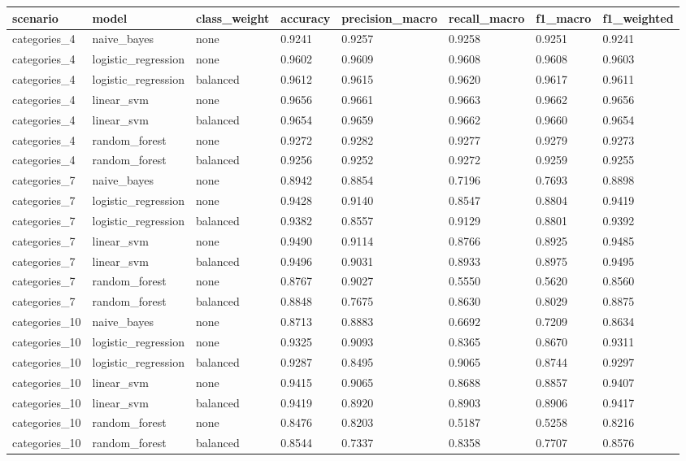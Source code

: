 \begin{tabular}{llllllll}
\hline
scenario & model & class\_weight & accuracy & precision\_macro & recall\_macro & f1\_macro & f1\_weighted \\
\hline
categories\_4 & naive\_bayes & none & 0.9241 & 0.9257 & 0.9258 & 0.9251 & 0.9241 \\
categories\_4 & logistic\_regression & none & 0.9602 & 0.9609 & 0.9608 & 0.9608 & 0.9603 \\
categories\_4 & logistic\_regression & balanced & 0.9612 & 0.9615 & 0.9620 & 0.9617 & 0.9611 \\
categories\_4 & linear\_svm & none & 0.9656 & 0.9661 & 0.9663 & 0.9662 & 0.9656 \\
categories\_4 & linear\_svm & balanced & 0.9654 & 0.9659 & 0.9662 & 0.9660 & 0.9654 \\
categories\_4 & random\_forest & none & 0.9272 & 0.9282 & 0.9277 & 0.9279 & 0.9273 \\
categories\_4 & random\_forest & balanced & 0.9256 & 0.9252 & 0.9272 & 0.9259 & 0.9255 \\
categories\_7 & naive\_bayes & none & 0.8942 & 0.8854 & 0.7196 & 0.7693 & 0.8898 \\
categories\_7 & logistic\_regression & none & 0.9428 & 0.9140 & 0.8547 & 0.8804 & 0.9419 \\
categories\_7 & logistic\_regression & balanced & 0.9382 & 0.8557 & 0.9129 & 0.8801 & 0.9392 \\
categories\_7 & linear\_svm & none & 0.9490 & 0.9114 & 0.8766 & 0.8925 & 0.9485 \\
categories\_7 & linear\_svm & balanced & 0.9496 & 0.9031 & 0.8933 & 0.8975 & 0.9495 \\
categories\_7 & random\_forest & none & 0.8767 & 0.9027 & 0.5550 & 0.5620 & 0.8560 \\
categories\_7 & random\_forest & balanced & 0.8848 & 0.7675 & 0.8630 & 0.8029 & 0.8875 \\
categories\_10 & naive\_bayes & none & 0.8713 & 0.8883 & 0.6692 & 0.7209 & 0.8634 \\
categories\_10 & logistic\_regression & none & 0.9325 & 0.9093 & 0.8365 & 0.8670 & 0.9311 \\
categories\_10 & logistic\_regression & balanced & 0.9287 & 0.8495 & 0.9065 & 0.8744 & 0.9297 \\
categories\_10 & linear\_svm & none & 0.9415 & 0.9065 & 0.8688 & 0.8857 & 0.9407 \\
categories\_10 & linear\_svm & balanced & 0.9419 & 0.8920 & 0.8903 & 0.8906 & 0.9417 \\
categories\_10 & random\_forest & none & 0.8476 & 0.8203 & 0.5187 & 0.5258 & 0.8216 \\
categories\_10 & random\_forest & balanced & 0.8544 & 0.7337 & 0.8358 & 0.7707 & 0.8576 \\
\hline
\end{tabular}
